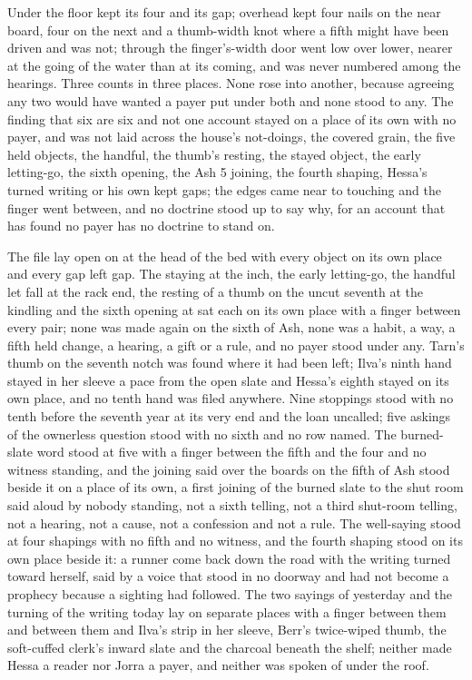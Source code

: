 Under the floor  kept its four and its gap; overhead  kept four nails on the near board, four on the next and a thumb-width knot where a fifth might have been driven and was not; through the finger's-width door  went low over lower, nearer at the going of the water than at its coming, and was never numbered among the hearings. Three counts in three places. None rose into another, because agreeing any two would have wanted a payer put under both and none stood to any. The finding that six are six and not one account stayed on a place of its own with no payer, and was not laid across the house's not-doings, the covered grain, the five held objects, the handful, the thumb's resting, the stayed object, the early letting-go, the sixth opening, the Ash 5 joining, the fourth shaping, Hessa's turned writing or his own kept gaps; the edges came near to touching and the finger went between, and no doctrine stood up to say why, for an account that has found no payer has no doctrine to stand on.

The file lay open on  at the head of the bed with every object on its own place and every gap left gap. The staying at the inch, the early letting-go, the handful let fall at the rack end, the resting of a thumb on the uncut seventh at the kindling and the sixth opening at  sat each on its own place with a finger between every pair; none was made again on the sixth of Ash, none was a habit, a way, a fifth held change, a hearing, a gift or a rule, and no payer stood under any. Tarn's thumb on the seventh notch was found where it had been left; Ilva's ninth hand stayed in her sleeve a pace from the open slate and Hessa's eighth stayed on its own place, and no tenth hand was filed anywhere. Nine stoppings stood with no tenth before the seventh year at its very end and the loan uncalled; five askings of the ownerless question stood with no sixth and no row named. The burned-slate word stood at five with a finger between the fifth and the four and no witness standing, and the joining said over the boards on the fifth of Ash stood beside it on a place of its own, a first joining of the burned slate to the shut room said aloud by nobody standing, not a sixth telling, not a third shut-room telling, not a hearing, not a cause, not a confession and not a rule. The well-saying stood at four shapings with no fifth and no witness, and the fourth shaping stood on its own place beside it: a runner come back down the road with the writing turned toward herself, said by a voice that stood in no doorway and had not become a prophecy because a sighting had followed. The two sayings of yesterday and the turning of the writing today lay on separate places with a finger between them and between them and Ilva's strip in her sleeve, Berr's twice-wiped thumb, the soft-cuffed clerk's inward slate and the charcoal beneath the shelf; neither made Hessa a reader nor Jorra a payer, and neither was spoken of under the roof.

